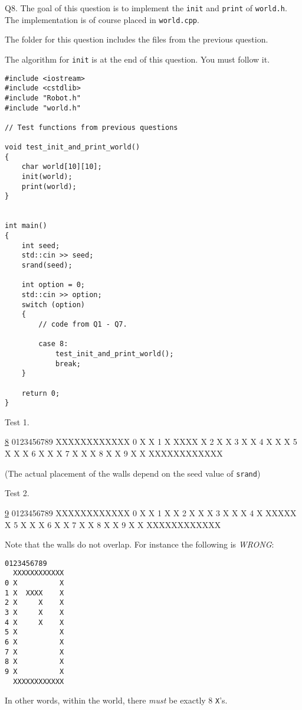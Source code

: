 Q8. 
The goal of this question is to implement the
\verb!init! and \verb!print!
of \verb!world.h!.
The implementation is of course placed in
\verb!world.cpp!.

The folder for this question
includes the files from the previous question.

The algorithm for \verb!init! is at the end of this question.
You must follow it.

{\small
\begin{Verbatim}[frame=single]
#include <iostream>
#include <cstdlib>
#include "Robot.h"
#include "world.h"

// Test functions from previous questions

void test_init_and_print_world()
{
    char world[10][10];
    init(world);
    print(world);
}


int main()
{
    int seed;
    std::cin >> seed;
    srand(seed);
    
    int option = 0;
    std::cin >> option;
    switch (option)
    {
        // code from Q1 - Q7.

        case 8:
            test_init_and_print_world();
            break;
    }
      
    return 0;
}
\end{Verbatim}
}

Test 1.
{\small
\begin{console}[commandchars=\\\{\}]
\underline{8}
   0123456789
  XXXXXXXXXXXX
0 X          X
1 X  XXXX    X
2 X          X
3 X          X
4 X      X   X
5 X      X   X
6 X      X   X
7 X      X   X
8 X          X
9 X          X
  XXXXXXXXXXXX
\end{console}
}
(The actual placement of the walls depend on the seed value of
\verb!srand!)

Test 2.
{\small
\begin{console}[commandchars=\\\{\}]
\underline{9}
  0123456789
  XXXXXXXXXXXX
0 X          X
1 X          X
2 X  X       X
3 X  X       X
4 X  XXXXX   X
5 X  X       X
6 X          X
7 X          X
8 X          X
9 X          X
  XXXXXXXXXXXX
\end{console}
}

Note that the walls do not overlap.
For instance the following is \textit{WRONG}:
\begin{Verbatim}[frame=single]
   0123456789
  XXXXXXXXXXXX
0 X          X
1 X  XXXX    X
2 X     X    X
3 X     X    X
4 X     X    X
5 X          X
6 X          X
7 X          X
8 X          X
9 X          X
  XXXXXXXXXXXX
\end{Verbatim}
In other words, within the world, there \textit{must} be exactly 8
\verb!X!'s.



